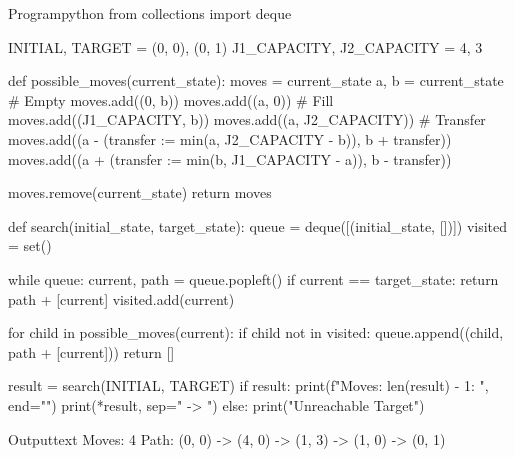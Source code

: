 \documentclass[11pt]{ipu-python}
\begin{document}
    \maketitle
    \newpage{}\pagestyle{fancy}\vspace*{-10pt}%
    \begin{code}
        {Program}{python}
from collections import deque

INITIAL, TARGET = (0, 0), (0, 1)
J1_CAPACITY, J2_CAPACITY = 4, 3

def possible_moves(current_state):
    moves = {current_state}
    a, b = current_state
    # Empty
    moves.add((0, b))
    moves.add((a, 0))
    # Fill
    moves.add((J1_CAPACITY, b))
    moves.add((a, J2_CAPACITY))
    # Transfer
    moves.add((a - (transfer := min(a, J2_CAPACITY - b)), b + transfer))
    moves.add((a + (transfer := min(b, J1_CAPACITY - a)), b - transfer))

    moves.remove(current_state)
    return moves

def search(initial_state, target_state):
    queue = deque([(initial_state, [])])
    visited = set()

    while queue:
        current, path = queue.popleft()
        if current == target_state:
            return path + [current]
        visited.add(current)

        for child in possible_moves(current):
            if child not in visited:
                queue.append((child, path + [current]))
    return []

result = search(INITIAL, TARGET)
if result:
    print(f"Moves: {len(result) - 1}\nPath: ", end="")
    print(*result, sep=" -> ")
else:
    print("Unreachable Target")
    \end{code}
    \begin{code}
        {Output}{text}
Moves: 4
Path: (0, 0) -> (4, 0) -> (1, 3) -> (1, 0) -> (0, 1)
    \end{code}
\end{document}
